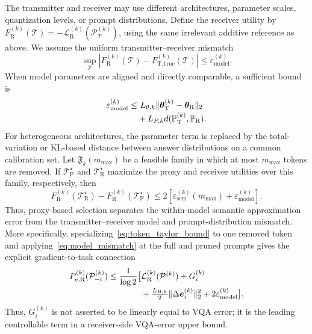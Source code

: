 \documentclass[journal]{IEEEtran}
\begin{document}
The transmitter and receiver may use different architectures, parameter scales, quantization levels, or prompt distributions. Define the receiver utility by $F_{\mathrm R}^{(k)}(\mathcal T)=-\mathcal L_{\mathrm R}^{(k)}(\mathcal P_{\mathcal T}^{(k)})$, using the same irrelevant additive reference as above. We assume the uniform transmitter--receiver mismatch
\begin{equation}
\sup_{\mathcal T}
|F_{\mathrm R}^{(k)}(\mathcal T)
-F_{\mathrm T,\mathrm{true}}^{(k)}(\mathcal T)|
\leq \varepsilon_{\mathrm{model}}^{(k)}.
\label{eq:model_mismatch}
\end{equation}
When model parameters are aligned and directly comparable, a sufficient bound is
\begin{align}
\varepsilon_{\mathrm{model}}^{(k)}
\leq&~L_{\theta,k}
\|\bm\theta_{\mathrm T}^{(k)}-\bm\theta_{\mathrm R}\|_2
\notag\\[-0.2em]
&+L_{P,k}d(\mathbb P_{\mathrm T}^{(k)},\mathbb P_{\mathrm R}).
\label{eq:model_mismatch_components}
\end{align}
For heterogeneous architectures, the parameter term is replaced by the total-variation or KL-based distance between answer distributions on a common calibration set. Let $\mathfrak F_k(m_{\max})$ be a feasible family in which at most $m_{\max}$ tokens are removed. If $\mathcal T_{\mathrm P}^{\star}$ and $\mathcal T_{\mathrm R}^{\star}$ maximize the proxy and receiver utilities over this family, respectively, then
\begin{equation}
F_{\mathrm R}^{(k)}(\mathcal T_{\mathrm R}^{\star})
-F_{\mathrm R}^{(k)}(\mathcal T_{\mathrm P}^{\star})
\leq 2\left[
\varepsilon_{\mathrm{sem}}^{(k)}(m_{\max})
+\varepsilon_{\mathrm{model}}^{(k)}
\right].
\label{eq:proxy_selection_gap}
\end{equation}
Thus, proxy-based selection separates the within-model semantic approximation error from the transmitter--receiver model and prompt-distribution mismatch. More specifically, specializing~\eqref{eq:token_taylor_bound} to one removed token and applying~\eqref{eq:model_mismatch} at the full and pruned prompts gives the explicit gradient-to-task connection
\begin{align}
P_{e,\mathrm R}^{(k)}(\mathcal P_{-i}^{(k)})
\leq\frac{1}{\log 2}\big[&\mathcal L_{\mathrm R}^{(k)}(\mathcal P^{(k)})
+G_i^{(k)}
\notag\\[-0.2em]
&+\tfrac{L_{H,k}}{2}\|\Delta\bm e_i^{(k)}\|_2^2
+2\varepsilon_{\mathrm{model}}^{(k)}\big].
\label{eq:gradient_vqa_connection}
\end{align}
Thus, $G_i^{(k)}$ is not asserted to be linearly equal to VQA error; it is the leading controllable term in a receiver-side VQA-error upper bound.
\end{document}
